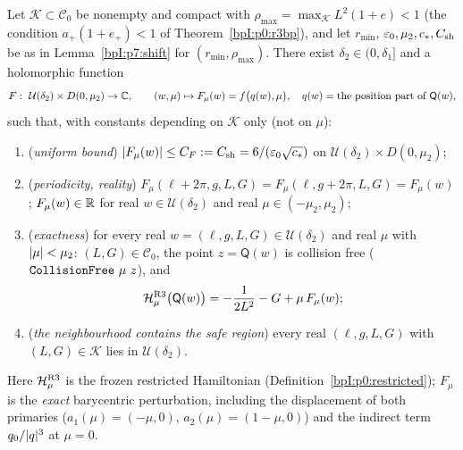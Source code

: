 \begin{proposition}\label{bpI:p7:exact-ham}
Let $\mathcal K\subset\mathcal C_0$ be nonempty and compact with $\rho_{\max}=\max_{\mathcal K}L^2(1+e)<1$ (the condition $a_+(1+e_+)<1$ of Theorem~\ref{bpI:p0:r3bp}), and let $r_{\min}$, $\varepsilon_0,\mu_2,c_*,C_{\rm sh}$ be as in Lemma~\ref{bpI:p7:shift} for $(r_{\min},\rho_{\max})$. There exist $\delta_2\in(0,\delta_1]$ and a holomorphic function
\[
F:\ \mathcal U(\delta_2)\times D(0,\mu_2)\to\mathbb{C},\qquad (w,\mu)\mapsto F_\mu(w)=f\bigl(q(w),\mu\bigr),\quad q(w)=\text{the position part of }\mathsf Q(w),
\]
such that, with constants depending on $\mathcal K$ only (not on $\mu$):
\begin{enumerate}[label=(\roman*)]
\item (\emph{uniform bound}) $\lvert F_\mu(w)\rvert\le C_F:=C_{\rm sh}=6/(\varepsilon_0\sqrt{c_*})$ on $\mathcal U(\delta_2)\times D(0,\mu_2)$;
\item (\emph{periodicity, reality}) $F_\mu(\ell+2\pi,g,L,G)=F_\mu(\ell,g+2\pi,L,G)=F_\mu(w)$; $F_\mu(w)\in\mathbb{R}$ for real $w\in\mathcal U(\delta_2)$ and real $\mu\in(-\mu_2,\mu_2)$;
\item (\emph{exactness}) for every real $w=(\ell,g,L,G)\in\mathcal U(\delta_2)$ and real $\mu$ with $\lvert \mu\rvert<\mu_2$: $(L,G)\in\mathcal C_0$, the point $z=\mathsf Q(w)$ is collision free ($\Lean{CollisionFree}\ \mu\ z$), and
  \[
  \mathcal H^{\rm R3}_\mu\bigl(\mathsf Q(w)\bigr)=-\frac1{2L^2}-G+\mu\,F_\mu(w);
  \]
\item (\emph{the neighbourhood contains the safe region}) every real $(\ell,g,L,G)$ with $(L,G)\in\mathcal K$ lies in $\mathcal U(\delta_2)$.
\end{enumerate}
Here $\mathcal H^{\rm R3}_\mu$ is the frozen restricted Hamiltonian (Definition~\ref{bpI:p0:restricted}); $F_\mu$ is the \emph{exact} barycentric perturbation, including the displacement of both primaries
($a_1(\mu)=(-\mu,0)$, $a_2(\mu)=(1-\mu,0)$) and the indirect term $q_0/\lvert q\rvert^3$ at $\mu=0$.
\end{proposition}

